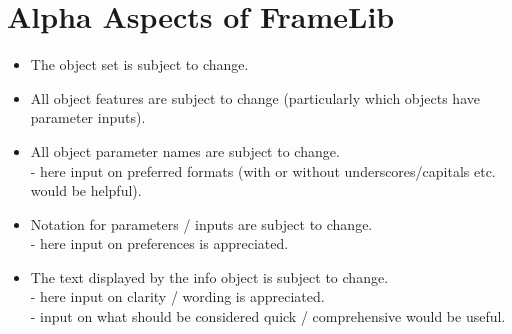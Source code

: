\documentclass{article}
\begin{document}
\pagebreak


\section{Alpha Aspects of FrameLib}
\vspace{0.1in}

 \begin{itemize}
\item{The object set is subject to change.}
\item{All object features are subject to change (particularly which objects have parameter inputs).}
\item{All object parameter names are subject to change. \\
 - here input on preferred formats (with or without underscores/capitals etc. would be helpful).}
\item{Notation for parameters / inputs are subject to change. \\
 - here input on preferences is appreciated.}
\item{The text displayed by the info object is subject to change. \\
 - here input on clarity / wording is appreciated. \\
 - input on what should be considered quick / comprehensive would be useful.}
  \end{itemize}
\end{document}
